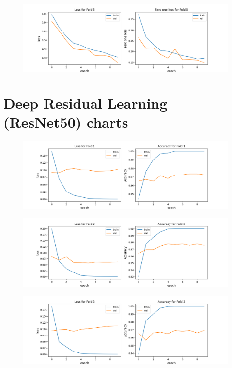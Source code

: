 \begin{appendices}
\begin{figure}[hbtp]
\centering
\includegraphics[scale=0.5]{../Images/cnn01_fold_5_zeroplot.png}
\end{figure}
\chapter{Deep Residual Learning (ResNet50) charts}
\begin{figure}[hbtp]

\centering
\includegraphics[scale=0.5]{../Images/res50_fold_1_plot.png}
\end{figure}
\begin{figure}[hbtp]

\centering
\includegraphics[scale=0.5]{../Images/res50_fold_2_plot.png}
\end{figure}
\begin{figure}[hbtp]

\centering
\includegraphics[scale=0.5]{../Images/res50_fold_3_plot.png}
\end{figure}
\begin{figure}[hbtp]


\end{figure}
\end{appendices}
